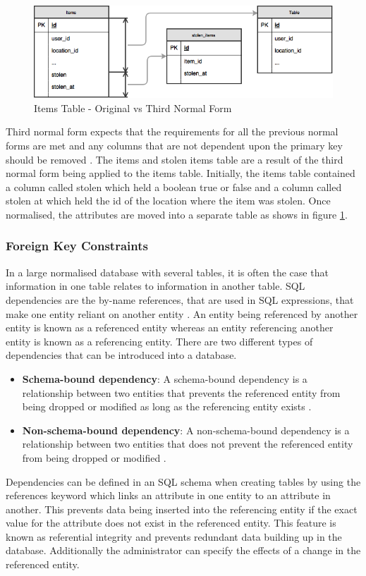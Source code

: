 \begin{figure}[H]
	\centering
	\includegraphics[width=1.0\textwidth]{images/Database/3NF_Items}
	\caption{Items Table - Original vs Third Normal Form} \label{fig:3NF_Items}
\end{figure}

Third normal form expects that the requirements for all the previous normal forms are met and any columns that are not dependent upon the primary key should be removed \cite{Databases:NormalisationBasics}. The items and stolen items table are a result of the third normal form being applied to the items table. Initially, the items table contained a column called stolen which held a boolean true or false and a column called stolen at which held the id of the location where the item was stolen. Once normalised, the attributes are moved into a separate table as shows in figure \ref{fig:3NF_Items}.

\subsubsection{Foreign Key Constraints} \label{Section:Database_Cascading}
In a large normalised database with several tables, it is often the case that information in one table relates to information in another table. SQL dependencies are the by-name references, that are used in SQL expressions, that make one entity reliant on another entity \cite{Microsoft:Dependencies}. An entity being referenced by another entity is known as a referenced entity whereas an entity referencing another entity is known as a referencing entity. There are two different types of dependencies that can be introduced into a database.
\begin{itemize}
	\item \textbf{Schema-bound dependency}: A schema-bound dependency is a relationship between two entities that prevents the referenced entity from being dropped or modified as long as the referencing entity exists \cite{Microsoft:Dependencies}.
	\item \textbf{Non-schema-bound dependency}: A non-schema-bound dependency is a relationship between two entities that does not prevent the referenced entity from being dropped or modified \cite{Microsoft:Dependencies}.
\end{itemize}
Dependencies can be defined in an SQL schema when creating tables by using the references keyword which links an attribute in one entity to an attribute in another. This prevents data being inserted into the referencing entity if the exact value for the attribute does not exist in the referenced entity. This feature is known as referential integrity and prevents redundant data building up in the database. Additionally the administrator can specify the effects of a change in the referenced entity.

